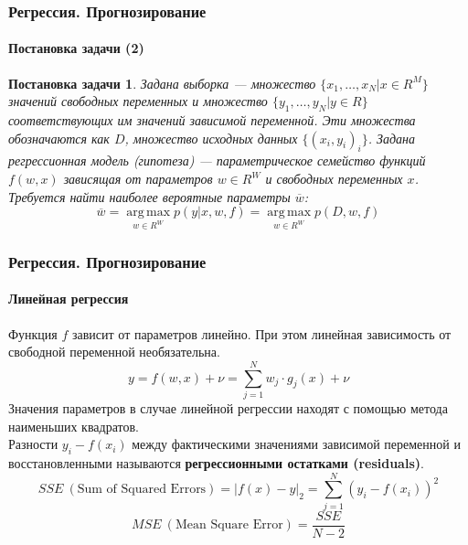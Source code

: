 \documentclass[xcolor=table]{beamer}
\newtheorem{prob}{Постановка задачи}
\begin{document}
\begin{frame}
  \frametitle{Регрессия. Прогнозирование}
  \framesubtitle{Постановка задачи (2)}

  \begin{prob}
    Задана выборка — множество $\{x_1, \dots, x_N | x \in R^M\}$ значений свободных переменных и множество $\{y_1, \dots, y_N | y \in R \}$ соответствующих 
    им значений зависимой переменной. Эти множества обозначаются как $D$, множество исходных данных $\{(x_i, y_i)_i\}$. Задана регрессионная модель (гипотеза) 
    — параметрическое семейство функций $f(w,x)$ зависящая от параметров $w \in R^W$ и свободных переменных $x$. Требуется найти наиболее вероятные параметры $\overline{w}$:
    \vspace{-10pt}
    \[
    \overline{w} = \operatorname*{arg\,max}_{w \in R^W}p(y | x, w, f) = \operatorname*{arg\,max}_{w \in R^W}p(D, w, f)
    \]
  \end{prob}
\end{frame}

\begin{frame}
  \frametitle{Регрессия. Прогнозирование}
  \framesubtitle{Линейная регрессия}

  Функция $f$ зависит от параметров  линейно. При этом линейная зависимость от свободной переменной  необязательна.
  \[ y = f(w, x) + \nu = \sum_{j=1}^N{w_j \cdot g_j(x)} + \nu\]
  Значения параметров в случае линейной регрессии находят с помощью \alert{метода наименьших квадратов}. \\
  Разности $y_i - f(x_i)$ между фактическими значениями зависимой переменной и восстановленными называются \textbf{регрессионными остатками (residuals)}.
  \[SSE~(\text{Sum of Squared Errors}) = |f(x) - y|_2 = \sum_{j=1}^N(y_i - f(x_i))^2\]
  \[MSE~(\text{Mean Square Error}) = \frac{SSE}{N - 2}\]
\end{frame}
\end{document}
